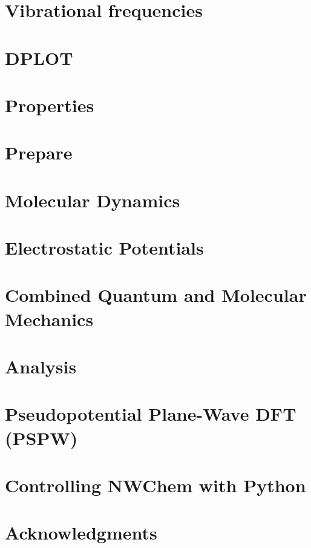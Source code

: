 \documentclass[12pt,fleqn]{book}
\begin{document}
\chapter{Vibrational frequencies}


\chapter{DPLOT}


\chapter{Properties}


\chapter{Prepare}


\chapter{Molecular Dynamics}


\chapter{Electrostatic Potentials}


\chapter{Combined Quantum and Molecular Mechanics}


\chapter{Analysis}



\chapter{Pseudopotential Plane-Wave DFT (PSPW)}


\chapter{Controlling NWChem with Python}


\clearpage
\chapter{Acknowledgments}

\clearpage
\end{document}
